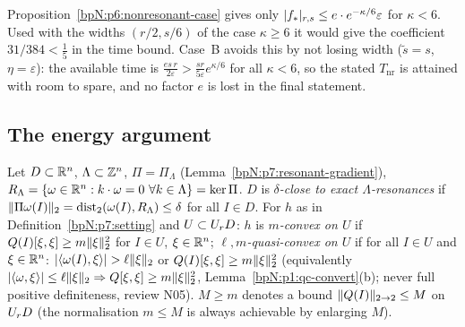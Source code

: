 \begin{remark}\label{bpN:p7:factor-e}
Proposition~\ref{bpN:p6:nonresonant-case} gives only $\lvert f_*\rvert_{r,s}\le e\cdot e^{-\kappa/6}\varepsilon$ for $\kappa<6$. Used with the widths $(r/2,s/6)$ of the case $\kappa\ge6$ it would give the coefficient $31/384<\frac15$ in the time bound. Case~B avoids this by not losing width ($\tilde s=s$, $\eta=\varepsilon$): the available time is $\frac{es\,r}{2\varepsilon}>\frac{sr}{5\varepsilon}e^{\kappa/6}$ for all $\kappa<6$, so the stated $T_{\mathrm{nr}}$ is attained with room to spare, and no factor $e$ is lost in the final statement.
\end{remark}

\subsection{The energy argument}\label{bpN:p7:s-energy}

\begin{definition}\label{bpN:p7:resonance-data}
Let $D\subset\mathbb{R}^n$, $\Lambda\subset\mathbb{Z}^n$, $\Pi=\Pi_\Lambda$ (Lemma~\ref{bpN:p7:resonant-gradient}), $R_\Lambda=\{\omega\in\R^n:k\cdot\omega=0\ \forall k\in\Lambda\}=\ker\Pi$. $D$ is \emph{$\delta$-close to exact $\Lambda$-resonances} if $\lVert \Pi\omega(I)\rVert_2=\operatorname{dist}_2(\omega(I),R_\Lambda)\le\delta$ for all $I\in D$.
For $h$ as in Definition~\ref{bpN:p7:setting} and $U\subset U_{r}D$: $h$ is \emph{$m$-convex on $U$} if $Q(I)[\xi,\xi]\ge m\lVert \xi\rVert_2^2$ for $I\in U$, $\xi\in\mathbb{R}^n$; \emph{$\ell,m$-quasi-convex on $U$} if for all $I\in U$ and $\xi\in\mathbb{R}^n$: $\lvert \langle \omega(I),\xi\rangle\rvert>\ell\lVert \xi\rVert_2$ or $Q(I)[\xi,\xi]\ge m\lVert \xi\rVert_2^2$ (equivalently $\lvert \langle \omega,\xi\rangle\rvert\le\ell\lVert \xi\rVert_2\Rightarrow Q[\xi,\xi]\ge m\lVert \xi\rVert_2^2$, Lemma~\ref{bpN:p1:qc-convert}(b); never full positive definiteness, review N05). $M\ge m$ denotes a bound $\lVert Q(I)\rVert_{2\to2}\le M$ on $U_{r}D$ (the normalisation $m\le M$ is always achievable by enlarging $M$).
\end{definition}

